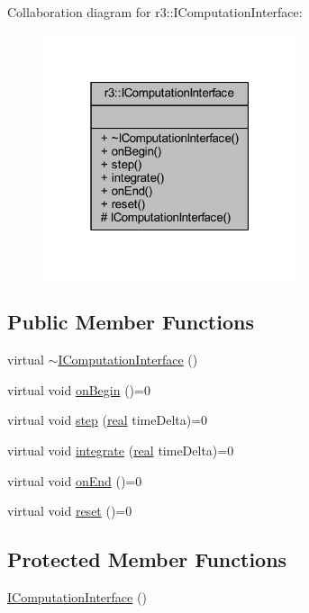 Collaboration diagram for r3\+:\+:I\+Computation\+Interface\+:\nopagebreak
\begin{figure}[H]
\begin{center}
\leavevmode
\includegraphics[width=211pt]{classr3_1_1_i_computation_interface__coll__graph}
\end{center}
\end{figure}
\subsection*{Public Member Functions}
\begin{DoxyCompactItemize}
\item 
virtual \mbox{\hyperlink{classr3_1_1_i_computation_interface_a88c5734b5636745f0200c03adac30994}{$\sim$\+I\+Computation\+Interface}} ()
\item 
virtual void \mbox{\hyperlink{classr3_1_1_i_computation_interface_a430ebc9cb8d4ba064ac6a032ef07edd7}{on\+Begin}} ()=0
\item 
virtual void \mbox{\hyperlink{classr3_1_1_i_computation_interface_aaa12bcc35005f32a1984b38de97696cb}{step}} (\mbox{\hyperlink{namespacer3_ab2016b3e3f743fb735afce242f0dc1eb}{real}} time\+Delta)=0
\item 
virtual void \mbox{\hyperlink{classr3_1_1_i_computation_interface_a162250f2b6efbd85460bd0f780d42cff}{integrate}} (\mbox{\hyperlink{namespacer3_ab2016b3e3f743fb735afce242f0dc1eb}{real}} time\+Delta)=0
\item 
virtual void \mbox{\hyperlink{classr3_1_1_i_computation_interface_acae0c5fada7e414c74fe6f5a8f4a6c7d}{on\+End}} ()=0
\item 
virtual void \mbox{\hyperlink{classr3_1_1_i_computation_interface_a6069989c54ffd4e714788d0968851007}{reset}} ()=0
\end{DoxyCompactItemize}
\subsection*{Protected Member Functions}
\begin{DoxyCompactItemize}
\item 
\mbox{\hyperlink{classr3_1_1_i_computation_interface_aa7ec35b2ab0cccd1a94ebdfeccc7bb43}{I\+Computation\+Interface}} ()
\end{DoxyCompactItemize}



